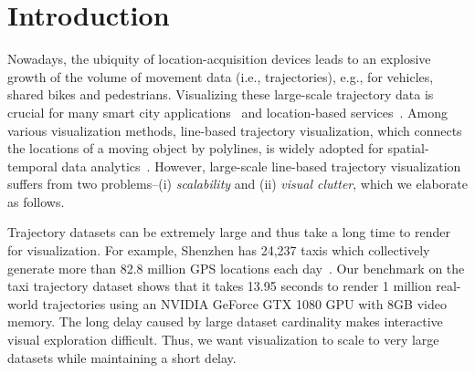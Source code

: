 \section{Introduction}\label{sec:intro}
Nowadays, the ubiquity of location-acquisition devices leads to an explosive growth of the volume of movement data (i.e., trajectories), e.g., for vehicles, shared bikes and pedestrians. Visualizing these large-scale trajectory data is crucial for many smart city applications~\cite{wang2014visual,tang2017efficient,zheng2011learning} and location-based services~\cite{liu2016smartadp, zheng2010collaborative}. Among various visualization methods, line-based trajectory visualization, which connects the locations of a moving object by polylines, is widely adopted for spatial-temporal data analytics~\cite{chen2015survey,visualanalysis,bigchanvis}. However, large-scale line-based trajectory visualization suffers from two problems--(i) \textit{scalability} and (ii) \textit{visual clutter}, which we elaborate as follows.


Trajectory datasets can be extremely large and thus take a long time to render for visualization. For example, Shenzhen has 24,237 taxis which collectively generate more than 82.8 million GPS locations each day~\cite{sz}. Our benchmark on the \pt{} taxi trajectory dataset shows that it takes 13.95 seconds to render 1 million real-world trajectories using an NVIDIA GeForce GTX 1080 GPU with 8GB video memory. The long delay caused by large dataset cardinality makes interactive visual exploration difficult. Thus, we want visualization to scale to very large datasets while maintaining a short delay.




